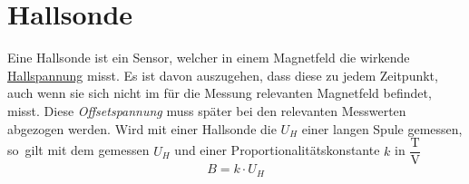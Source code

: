 \documentclass{article}
\begin{document}
\section{Hallsonde} 
Eine Hallsonde ist ein Sensor, welcher in einem Magnetfeld die wirkende \hyperref[Hall Effekt]{Hallspannung} misst. Es ist davon auszugehen, dass diese zu jedem Zeitpunkt, auch wenn sie sich nicht im für die Messung relevanten Magnetfeld befindet, misst. Diese \emph{Offsetspannung} muss später bei den relevanten Messwerten abgezogen werden. \newline
Wird mit einer Hallsonde die $U_H$ einer langen Spule gemessen, so gilt mit dem gemessen $U_H$ und einer Proportionalitätskonstante $k$ in $\dfrac{\text{T}}{\text{V}}$
\[
 B = k \cdot U_H 
\] %
\end{document}
